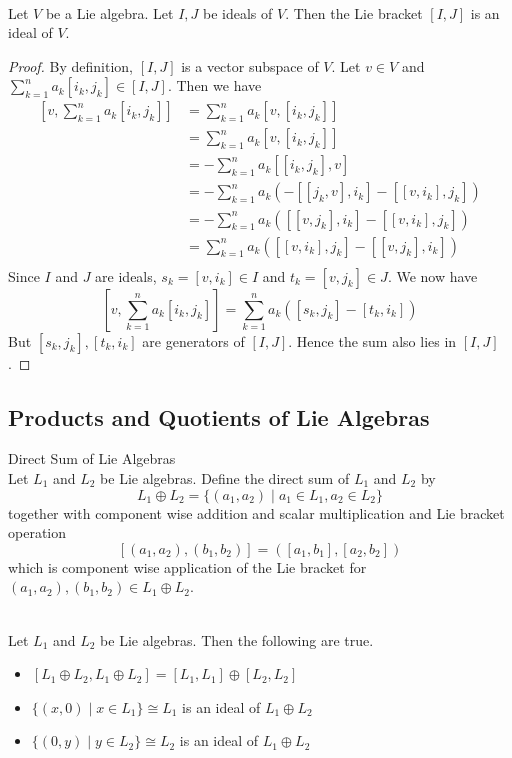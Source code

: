 \documentclass[a4paper]{article}
\begin{document}
\begin{lmm}{}{} \\Let $V$ be a Lie algebra. Let $I,J$ be ideals of $V$. Then the Lie bracket $[I,J]$ is an ideal of $V$. 
\begin{proof}
By definition, $[I,J]$ is a vector subspace of $V$. Let $v\in V$ and $\sum_{k=1}^na_k[i_k,j_k]\in[I,J]$. Then we have
\begin{align*}
\left[v,\sum_{k=1}^na_k[i_k,j_k]\right]&=\sum_{k=1}^na_k[v,[i_k,j_k]]\\
&=\sum_{k=1}^na_k[v,[i_k,j_k]]\\
&=-\sum_{k=1}^na_k[[i_k,j_k],v]\\
&=-\sum_{k=1}^na_k\left(-[[j_k,v],i_k]-[[v,i_k],j_k]\right)\\
&=-\sum_{k=1}^na_k\left([[v,j_k],i_k]-[[v,i_k],j_k]\right)\\
&=\sum_{k=1}^na_k\left([[v,i_k],j_k]-[[v,j_k],i_k]\right)\\
\end{align*}
Since $I$ and $J$ are ideals, $s_k=[v,i_k]\in I$ and $t_k=[v,j_k]\in J$. We now have $$\left[v,\sum_{k=1}^na_k[i_k,j_k]\right]=\sum_{k=1}^na_k\left([s_k,j_k]-[t_k,i_k]\right)$$ But $[s_k,j_k],[t_k,i_k]$ are generators of $[I,J]$. Hence the sum also lies in $[I,J]$. 
\end{proof}
\end{lmm}

\subsection{Products and Quotients of Lie Algebras}
\begin{defn}{Direct Sum of Lie Algebras}{} \\Let $L_1$ and $L_2$ be Lie algebras. Define the direct sum of $L_1$ and $L_2$ by $$L_1\oplus L_2=\{(a_1,a_2)\;|\;a_1\in L_1,a_2\in L_2\}$$ together with component wise addition and scalar multiplication and Lie bracket operation $$[(a_1,a_2),(b_1,b_2)]=([a_1,b_1],[a_2,b_2])$$ which is component wise application of the Lie bracket for $(a_1,a_2),(b_1,b_2)\in L_1\oplus L_2$. 
\end{defn}

\begin{prp}{}{} \\Let $L_1$ and $L_2$ be Lie algebras. Then the following are true. 
\begin{itemize}
\item $[L_1\oplus L_2,L_1\oplus L_2]=[L_1,L_1]\oplus[L_2,L_2]$
\item $\{(x,0)\;|\;x\in L_1\}\cong L_1$ is an ideal of $L_1\oplus L_2$
\item $\{(0,y)\;|\;y\in L_2\}\cong L_2$ is an ideal of $L_1\oplus L_2$
\end{itemize}
\end{prp}
\end{document}
